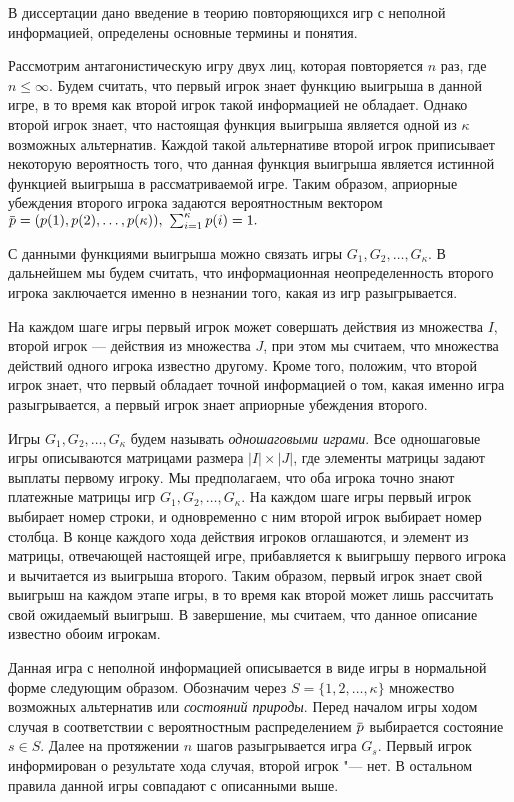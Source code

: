 В  диссертации дано введение в теорию повторяющихся игр с неполной информацией, определены основные термины и понятия.

Рассмотрим антагонистическую игру двух лиц, которая повторяется $n$ раз, где $n\leq \infty$.
Будем считать, что первый игрок знает функцию выигрыша в данной игре, в то время как второй игрок такой информацией не обладает.
Однако второй игрок знает, что настоящая функция выигрыша является одной из $\kappa$ возможных альтернатив.
Каждой такой альтернативе второй игрок приписывает некоторую вероятность того, что данная функция выигрыша является истинной функцией выигрыша в рассматриваемой
игре.
Таким образом, априорные убеждения второго игрока задаются вероятностным вектором
$
  \pd = (\pc{1}, \pc{2}, \ldots, \pc{\kappa}),\ \sum_{i=1}^\kappa \pc{i} = 1.
$

С данными функциями выигрыша можно связать игры $G_1, G_2, \ldots, G_\kappa$.
В дальнейшем мы будем считать, что информационная неопределенность второго игрока заключается именно в незнании того, какая из игр разыгрывается.

На каждом шаге игры первый игрок может совершать действия из множества $I$, второй игрок --- действия из множества $J$, при этом мы считаем, что множества действий одного игрока известно другому.
Кроме того, положим, что второй игрок знает, что первый обладает точной информацией о том, какая именно игра разыгрывается, а первый игрок знает априорные убеждения второго.

Игры $G_1, G_2, \ldots, G_\kappa$ будем называть \emph{одношаговыми играми}.
Все одношаговые игры описываются матрицами размера $|I| \times |J|$, где элементы матрицы задают выплаты первому игроку.
Мы предполагаем, что оба игрока точно знают платежные матрицы игр $G_1, G_2, \ldots, G_\kappa$.
На каждом шаге игры первый игрок выбирает номер строки, и одновременно с ним второй игрок выбирает номер столбца.
В конце каждого хода действия игроков оглашаются, и элемент из матрицы, отвечающей настоящей игре, прибавляется к выигрышу первого игрока и вычитается из выигрыша второго.
Таким образом, первый игрок знает свой выигрыш на каждом этапе игры, в то время как второй может лишь рассчитать свой ожидаемый выигрыш.
В завершение, мы считаем, что данное описание известно обоим игрокам.

Данная игра с неполной информацией описывается в виде игры в нормальной форме следующим образом.
Обозначим через $S = \{1, 2, \ldots, \kappa\}$ множество возможных альтернатив или \emph{состояний природы}.
Перед началом игры ходом случая в соответствии с вероятностным распределением $\pd$ выбирается состояние $s \in S$.
Далее на протяжении $n$ шагов разыгрывается игра $G_s$.
Первый игрок информирован о результате хода случая, второй игрок "--- нет.
В остальном правила данной игры совпадают с описанными выше.

